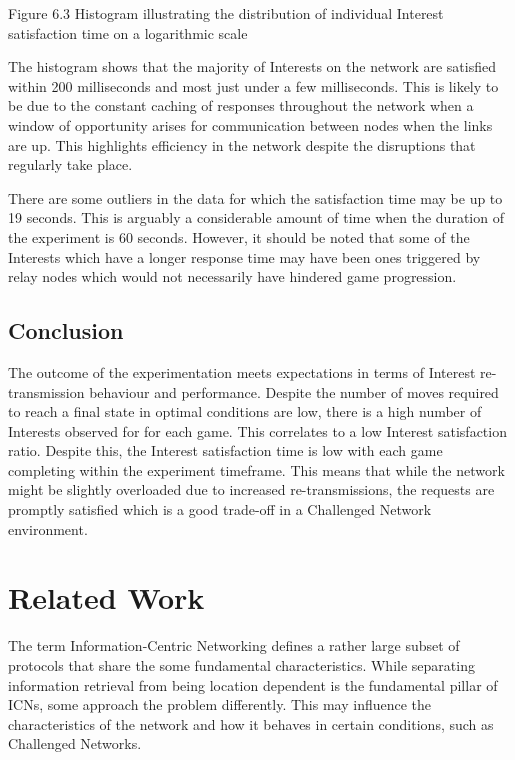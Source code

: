 \documentclass[a4paper,12pt]{report}      %
\begin{document}
\begin{center}Figure 6.3 Histogram illustrating the distribution of individual Interest satisfaction time on a logarithmic scale\end{center}

The histogram shows that the majority of Interests on the network are satisfied within 200 milliseconds
and most just under a few milliseconds. This is likely to be due to the constant caching of responses
throughout the network when a window of opportunity arises for communication between nodes when
the links are up. This highlights efficiency in the network despite the disruptions that regularly take
place.

There are some outliers in the data for which the satisfaction time may be up to 19 seconds. This is
arguably a considerable amount of time when the duration of the experiment is 60 seconds. However, it
should be noted that some of the Interests which have a longer response time may have been ones
triggered by relay nodes which would not necessarily have hindered game progression.

\section{Conclusion}

The outcome of the experimentation meets expectations in terms of Interest re-transmission behaviour and performance.
Despite the number of moves required to reach a final state in optimal conditions are low, there is a high number of Interests observed for for each game.
This correlates to a low Interest satisfaction ratio. Despite this, the Interest satisfaction time is low with each game completing within the experiment timeframe.
This means that while the network might be slightly overloaded due to increased re-transmissions, the requests are promptly satisfied which is a good trade-off in a Challenged Network environment.

\pagebreak
\chapter{Related Work}

The term Information-Centric Networking defines a rather large subset of protocols that share the some
fundamental characteristics. While separating information retrieval from being location dependent is
the fundamental pillar of ICNs, some approach the problem differently. This may influence the
characteristics of the network and how it behaves in certain conditions, such as Challenged Networks.
\end{document}
